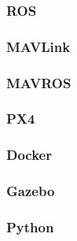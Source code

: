 \subsubsection{ROS}

\newpage

\subsubsection{MAVLink}


\subsubsection{MAVROS}

\newpage

\subsubsection{PX4}


\subsubsection{Docker}

\newpage

\subsubsection{Gazebo}


\subsubsection{Python}
